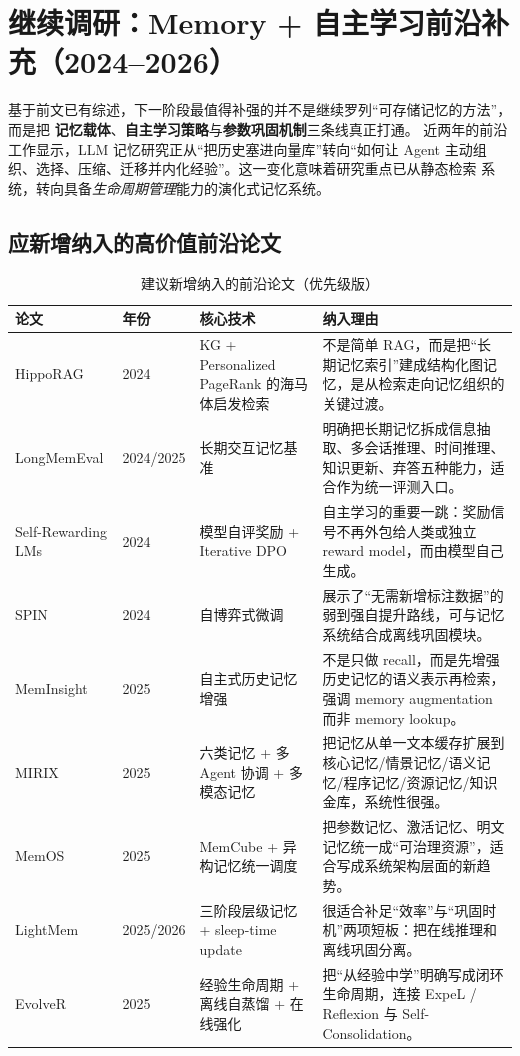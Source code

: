 \documentclass[11pt,a4paper]{article}
\begin{document}
\section{继续调研：Memory + 自主学习前沿补充（2024--2026）}

基于前文已有综述，下一阶段最值得补强的并不是继续罗列“可存储记忆的方法”，而是把
\textbf{记忆载体}、\textbf{自主学习策略}与\textbf{参数巩固机制}三条线真正打通。
近两年的前沿工作显示，LLM 记忆研究正从“把历史塞进向量库”转向“如何让 Agent
主动组织、选择、压缩、迁移并内化经验”。这一变化意味着研究重点已从静态检索
系统，转向具备\emph{生命周期管理}能力的演化式记忆系统。

\subsection{应新增纳入的高价值前沿论文}

\begin{table}[h!]
\centering
\caption{建议新增纳入的前沿论文（优先级版）}
\renewcommand{\arraystretch}{1.25}
\small
\begin{tabular}{p{3.2cm}p{1.1cm}p{4.3cm}p{5.8cm}}
\toprule
\textbf{论文} & \textbf{年份} & \textbf{核心技术} & \textbf{纳入理由} \\
\midrule
HippoRAG & 2024 & KG + Personalized PageRank 的海马体启发检索 & 不是简单 RAG，而是把“长期记忆索引”建成结构化图记忆，是从检索走向记忆组织的关键过渡。 \\
LongMemEval & 2024/2025 & 长期交互记忆基准 & 明确把长期记忆拆成信息抽取、多会话推理、时间推理、知识更新、弃答五种能力，适合作为统一评测入口。 \\
Self-Rewarding LMs & 2024 & 模型自评奖励 + Iterative DPO & 自主学习的重要一跳：奖励信号不再外包给人类或独立 reward model，而由模型自己生成。 \\
SPIN & 2024 & 自博弈式微调 & 展示了“无需新增标注数据”的弱到强自提升路线，可与记忆系统结合成离线巩固模块。 \\
MemInsight & 2025 & 自主式历史记忆增强 & 不是只做 recall，而是先增强历史记忆的语义表示再检索，强调 memory augmentation 而非 memory lookup。 \\
MIRIX & 2025 & 六类记忆 + 多 Agent 协调 + 多模态记忆 & 把记忆从单一文本缓存扩展到核心记忆/情景记忆/语义记忆/程序记忆/资源记忆/知识金库，系统性很强。 \\
MemOS & 2025 & MemCube + 异构记忆统一调度 & 把参数记忆、激活记忆、明文记忆统一成“可治理资源”，适合写成系统架构层面的新趋势。 \\
LightMem & 2025/2026 & 三阶段层级记忆 + sleep-time update & 很适合补足“效率”与“巩固时机”两项短板：把在线推理和离线巩固分离。 \\
EvolveR & 2025 & 经验生命周期 + 离线自蒸馏 + 在线强化 & 把“从经验中学”明确写成闭环生命周期，连接 ExpeL / Reflexion 与 Self-Consolidation。 \\
\bottomrule
\end{tabular}
\end{table}
\end{document}
